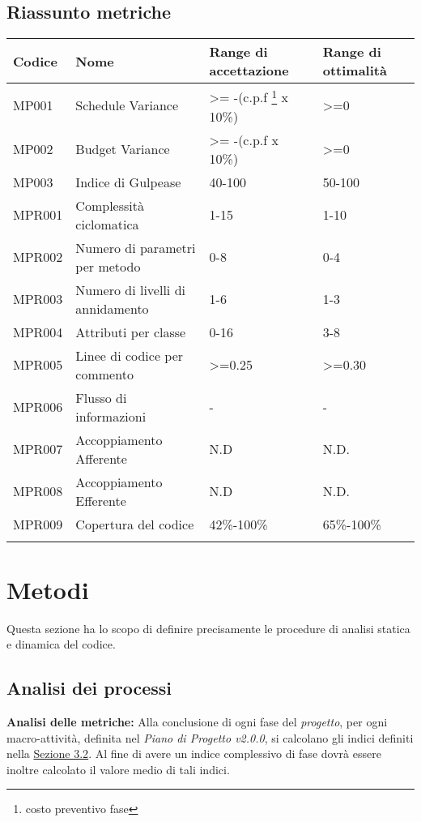 \subsection{Riassunto metriche}
\begin{center}
\begin{tabularx}{\textwidth}{|X|X|X|X|}

	\hline
	\textbf{Codice} & \textbf{Nome} & 	\textbf{Range di accettazione} & \textbf{Range di ottimalità}\\
	\endhead
	\hline
	MP001 & Schedule Variance& >= -(c.p.f \footnote{costo preventivo fase} x 10\%)& >=0  \\
	\hline
	MP002 & Budget Variance & >= -(c.p.f x 10\%)& >=0 \\
	\hline
	MP003 & Indice di Gulpease & 40-100 & 50-100\\
	\hline
	MPR001 & Complessità ciclomatica & 1-15 & 1-10 \\
	\hline
	MPR002 & Numero di parametri per metodo & 0-8 & 0-4 \\
	\hline
	MPR003 & Numero di livelli di annidamento & 1-6 & 1-3 \\
	\hline
	MPR004 & Attributi per classe & 0-16 & 3-8 \\
	\hline
	MPR005 & Linee di codice per commento & >=0.25 & >=0.30 \\
	\hline
	MPR006 & Flusso di informazioni & - & - \\
	\hline
	MPR007 & Accoppiamento Afferente & N.D & N.D. \\
	\hline
	MPR008 & Accoppiamento Efferente& N.D & N.D. \\
	\hline
	MPR009 & Copertura del codice & 42\%-100\% & 65\%-100\% \\
	\hline
	\caption{Tabella delle metriche}
\end{tabularx}
\end{center}

\section{Metodi}\label{Metodi}
Questa sezione ha lo scopo di definire precisamente le procedure di analisi statica e dinamica del codice.
\subsection{Analisi dei processi}
	 \textbf{Analisi delle metriche:} Alla conclusione di ogni fase del \textit{progetto}, per ogni macro-attività, definita nel
	\textit{Piano di Progetto v2.0.0}, si calcolano gli indici definiti nella \hyperref[Metriche]{Sezione 3.2}. Al fine
	di avere un indice complessivo di fase dovrà essere inoltre calcolato il valore medio
	di tali indici.
